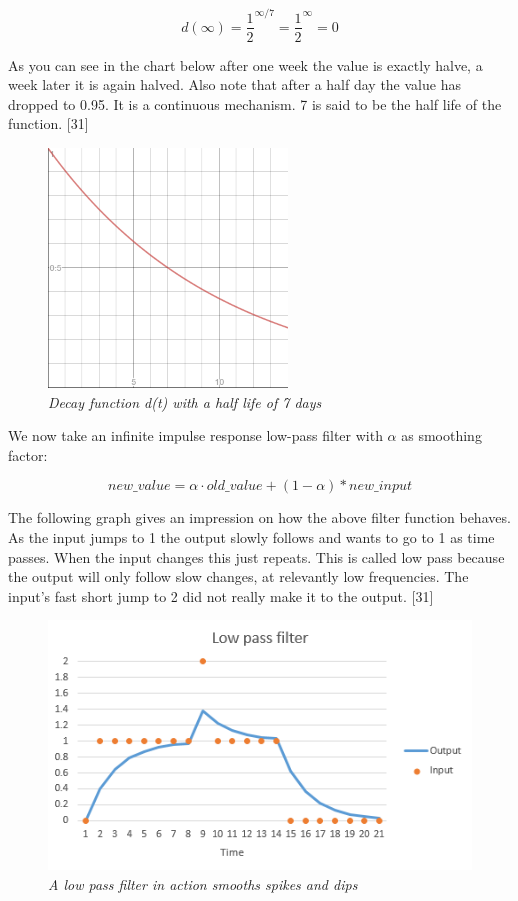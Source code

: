 \begin{equation}
d(\infty) = \frac{1}{2}^{\infty/7} = \frac{1}{2}^{\infty} = 0 
\end{equation}


As you can see in the chart below after one week the value is exactly halve, a week later it is again halved. Also note that after a half day the value has dropped to 0.95. It is a continuous mechanism. 7 is said to be the half life of the function. [31]\\


\begin{figure}
\centering
\includegraphics{figures/halflife}
\medskip
\caption{\textit{Decay function d(t) with a half life of 7 days }}
\small
\end{figure}


We now take an infinite impulse response low-pass filter with $\alpha$ as smoothing factor:

\begin{equation}
new\_value = \alpha \cdot old\_value + (1-\alpha) * new\_input
\end{equation}

The following graph gives an impression on how the above filter function behaves. As the input jumps to 1 the output slowly follows and wants to go to 1 as time passes. When the input changes this just repeats. This is called low pass because the output will only follow slow changes, at relevantly low frequencies. The input’s fast short jump to 2 did not really make it to the output. [31]\\

\begin{figure}
\centering
\includegraphics{figures/low-pass}
\caption{\textit{A low pass filter in action smooths spikes and dips}}
\small
\end{figure}


